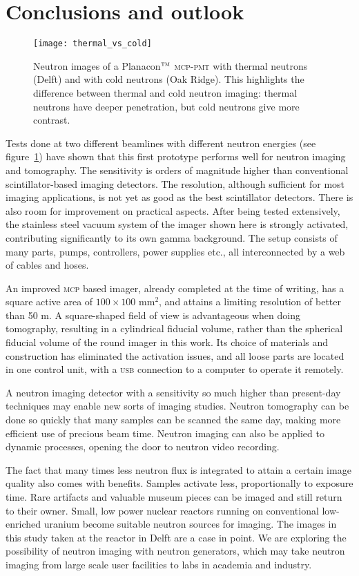 \documentclass[a4paper,11pt]{article}
\begin{document}
\section{Conclusions and outlook}
\begin{figure}[b]
	\centering\texttt{[image: thermal\_vs\_cold]}
	\caption{Neutron images of a Planacon$^\textsc{tm}$ \textsc{mcp-pmt} with thermal neutrons (Delft) and with cold neutrons (Oak Ridge). This highlights the difference between thermal and cold neutron imaging: thermal neutrons have deeper penetration, but cold neutrons give more contrast.\label{thermal_vs_cold}}
\end{figure}
Tests done at two different beamlines with different neutron energies (see figure~\ref{thermal_vs_cold}) have shown that this first prototype performs well for neutron imaging and tomography.
The sensitivity is orders of magnitude higher than conventional scintillator-based imaging detectors.
The resolution, although sufficient for most imaging applications, is not yet as good as the best scintillator detectors.
There is also room for improvement on practical aspects.
After being tested extensively, the stainless steel vacuum system of the imager shown here is strongly activated, contributing significantly to its own gamma background.
The setup consists of many parts, pumps, controllers, power supplies etc., all interconnected by a web of cables and hoses.

An improved \textsc{mcp} based imager, already completed at the time of writing, has a square active area of $100\times100$ mm$^2$, and attains a limiting resolution of better than 50 \textmu m.
A square-shaped field of view is advantageous when doing tomography, resulting in a cylindrical fiducial volume, rather than the spherical fiducial volume of the round imager in this work.
Its choice of materials and construction has eliminated the activation issues, and all loose parts are located in one control unit, with a \textsc{usb} connection to a computer to operate it remotely.

A neutron imaging detector with a sensitivity so much higher than present-day techniques may enable new sorts of imaging studies.
Neutron tomography can be done so quickly that many samples can be scanned the same day, making more efficient use of precious beam time.
Neutron imaging can also be applied to dynamic processes, opening the door to neutron video recording.

The fact that many times less neutron flux is integrated to attain a certain image quality also comes with benefits.
Samples activate less, proportionally to exposure time.
Rare artifacts and valuable museum pieces can be imaged and still return to their owner.
Small, low power nuclear reactors running on conventional low-enriched uranium become suitable neutron sources for imaging.
The images in this study taken at the reactor in Delft are a case in point.
We are exploring the possibility of neutron imaging with neutron generators, which may take neutron imaging from large scale user facilities to labs in academia and industry.
\end{document}
